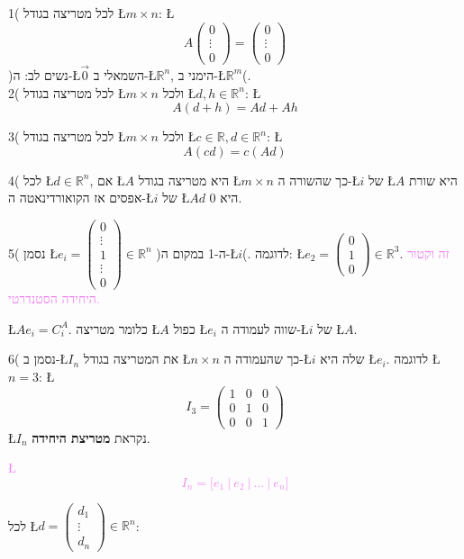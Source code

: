 \documentclass[english,hebrew]{article}
\begin{document}
1( לכל מטריצה בגודל \L{$m\times n$}: \L{%
\[
A\begin{pmatrix}0\\
\vdots\\
0
\end{pmatrix}=\begin{pmatrix}0\\
\vdots\\
0
\end{pmatrix}
\]
}%
)נשים לב: ה-\L{$\vec{0}$} השמאלי ב-\L{$\mathbb{R}^{n}$}, הימני ב-\L{$\mathbb{R}^{m}$}(.\\

2( לכל מטריצה בגודל \L{$m\times n$} ולכל \L{$d,h\in\mathbb{R}^{n}$}:
\L{%
\[
A(d+h)=Ad+Ah
\]
}%

3( לכל מטריצה בגודל \L{$m\times n$} ולכל \L{$c\in\mathbb{R},d\in\mathbb{R}^{n}$}:
\L{%
\[
A(cd)=c(Ad)
\]
}%

4( לכל \L{$d\in\mathbb{R}^{n}$}, אם \L{$A$} היא מטריצה בגודל \L{$m\times n$}
כך שהשורה ה-\L{$i$} של \L{$A$} היא שורת אפסים אז הקואורדינאטה ה-\L{$i$}
של \L{$Ad$} היא 0.

5( נסמן \L{$e_{i}=\begin{pmatrix}0\\
\vdots\\
1\\
\vdots\\
0
\end{pmatrix}\in\mathbb{R}^{n}$} )ה-1 במקום ה-\L{$i$}(. לדוגמה: \L{$e_{2}=\begin{pmatrix}0\\
1\\
0
\end{pmatrix}\in\mathbb{R}^{3}$}. \textcolor{violet}{זה וקטור היחידה הסטנדרטי.}

\L{$Ae_{i}=C_{i}^{A}$}. כלומר מטריצה \L{$A$} כפול \L{$e_{i}$} שווה
לעמודה ה-\L{$i$} של \L{$A$}.

6( נסמן ב-\L{$I_{n}$} את המטריצה בגודל \L{$n\times n$} כך שהעמודה
ה-\L{$i$} שלה היא \L{$e_{i}$}. לדוגמה \L{$n=3$}: \L{%
\[
I_{3}=\begin{pmatrix}1 & 0 & 0\\
0 & 1 & 0\\
0 & 0 & 1
\end{pmatrix}
\]
}%
\L{$I_{n}$} נקראת \textbf{מטריצת היחידה}.

\textcolor{violet}{\L{%
\[
I_{n}=\Big[e_{1}\ \big|\ e_{2}\ \big|\ \dots\ \big|\ e_{n}\Big]
\]
}%
}

לכל \L{$d=\begin{pmatrix}d_{1}\\
\vdots\\
d_{n}
\end{pmatrix}\in\mathbb{R}^{n}$}:
\end{document}
